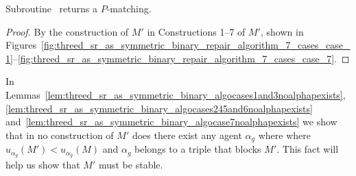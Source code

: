 \begin{lem}
\label{lem:threed_sr_as_symmetric_binary_algreturnspmatching}
Subroutine~ returns a $P$\nobreakdash-matching.
\end{lem}
\begin{proof}
By the construction of $M'$ in Constructions 1--7 of $M'$, shown in Figures~\ref{fig:threed_sr_as_symmetric_binary_repair_algorithm_7_cases_case_1}\nobreakdash--\ref{fig:threed_sr_as_symmetric_binary_repair_algorithm_7_cases_case_7}.
\end{proof}

In Lemmas~\ref{lem:threed_sr_as_symmetric_binary_algocases1and3noalphapexists}, \ref{lem:threed_sr_as_symmetric_binary_algocases245and6noalphapexists} and~\ref{lem:threed_sr_as_symmetric_binary_algocase7noalphapexists} we show that in no construction of $M'$ does there exist any agent $\alpha_g$ where where $u_{\alpha_{g}}(M') < u_{\alpha_{g}}(M)$ and $\alpha_g$ belongs to a triple that blocks $M'$. This fact will help us show that $M'$ must be stable.


